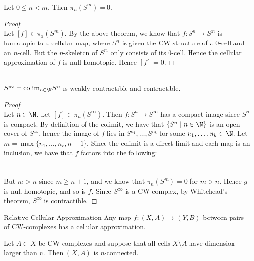 \documentclass[a4paper]{article}
\begin{document}
\begin{eg}{}{}\\
Let $0\leq n<m$. Then $\pi_n(S^m)=0$. 
\begin{proof}\\
Let $[f]\in\pi_n(S^m)$. By the above theorem, we know that $f:S^n\to S^m$ is homotopic to a cellular map, where $S^n$ is given the CW structure of a $0$-cell and an $n$-cell. But the $n$-skeleton of $S^m$ only consists of its $0$-cell. Hence the cellular approximation of $f$ is null-homotopic. Hence $[f]=0$. 
\end{proof}
\end{eg}

\begin{eg}{}{}\\
$S^\infty=\text{colim}_{n\in\N}S^n$ is weakly contractible and contractible. 
\begin{proof}\\
Let $n\in\N$. Let $[f]\in\pi_n(S^\infty)$. Then $f:S^n\to S^\infty$ has a compact image since $S^n$ is compact. By definition of the colimit, we have that $\{S^n\;|\;n\in\N\}$ is an open cover of $S^\infty$, hence the image of $f$ lies in $S^{n_1},\dots,S^{n_k}$ for some $n_1,\dots,n_k\in\N$. Let $m=\max\{n_1,\dots,n_k,n+1\}$. Since the colimit is a direct limit and each map is an inclusion, we have that $f$ factors into the following: \\~\\
\\
But $m>n$ since $m\geq n+1$, and we know that $\pi_n(S^m)=0$ for $m>n$. Hence $g$ is null homotopic, and so is $f$. Since $S^\infty$ is a CW complex, by Whitehead's theorem, $S^\infty$ is contractible. 
\end{proof}
\end{eg}

\begin{thm}{Relative Cellular Approximation}{} Any map $f:(X,A)\to (Y,B)$ between pairs of CW-complexes has a cellular approximation. 
\end{thm}

\begin{crl}{}{} Let $A\subset X$ be CW-complexes and suppose that all cells $X\setminus A$ have dimension larger than $n$. Then $(X,A)$ is $n$-connected. 
\end{crl}
\end{document}
